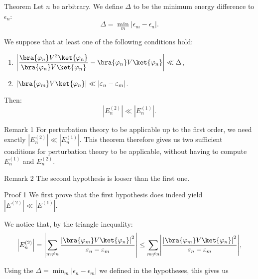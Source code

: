 \documentclass[a4paper]{article}
\begin{document}
\begin{parag}{Theorem}
    Let $n$ be arbitrary. We define $\Delta$ to be the minimum energy difference to $\epsilon_n$: 
    \[\Delta = \min_m \left|\epsilon_m - \epsilon_n\right|.\]
    
    We suppose that at least one of the following conditions hold: 
    \begin{enumerate}
        \item $\displaystyle \left|\frac{\bra{\phi_n} V^2 \ket{\phi_n}}{\bra{\phi_n} V \ket{\phi_n}} - \bra{\phi_n} V \ket{\phi_n}\right| \ll \Delta$,
        \item $\displaystyle \left|\bra{\phi_m} V \ket{\phi_n}\right| \ll \left|\epsilon_n - \epsilon_m\right|$.
    \end{enumerate}
    
    Then: 
    \[\left|E_n^{\left(2\right)}\right| \ll \left|E_n^{\left(1\right)}\right|.\]

    \begin{subparag}{Remark 1}
        For perturbation theory to be applicable up to the first order, we need exactly $\left|E_n^{\left(2\right)}\right| \ll \left|E_n^{\left(1\right)}\right|$. This theorem therefore gives us two sufficient conditions for perturbation theory to be applicable, without having to compute $E_n^{\left(1\right)}$ and $E_n^{\left(2\right)}$.
    \end{subparag}

    \begin{subparag}{Remark 2}
        The second hypothesis is looser than the first one.
    \end{subparag}
   
    \begin{subparag}{Proof 1}
        We first prove that the first hypothesis does indeed yield $\left|E^{\left(2\right)}\right| \ll \left|E^{\left(1\right)}\right|$.

        We notice that, by the triangle inequality: 
        \[\left|E_n^{\left(2\right)}\right| = \left|\sum_{m \neq n} \frac{\left|\bra{\phi_m} V \ket{\phi_n}\right|^2}{\epsilon_n - \epsilon_m}\right| \leq \sum_{m\neq n} \left|\frac{\left|\bra{\phi_m}V \ket{\phi_n}\right|^2}{\epsilon_n - \epsilon_m}\right|,\]
        
        Using the $\Delta = \min_m \left|\epsilon_n - \epsilon_m\right|$ we defined in the hypotheses, this gives us
        

\end{subparag}
\end{parag}
\end{document}
